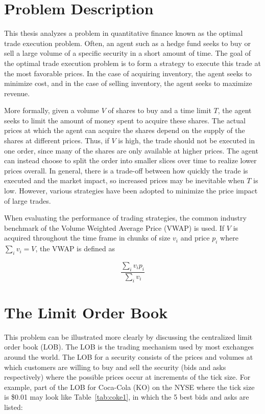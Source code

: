 \section{Problem Description} \label{ch:problemdescription}

This thesis analyzes a problem in quantitative finance known as the optimal trade execution problem. Often, an agent such as a hedge fund seeks to buy or sell a large volume of a specific security in a short amount of time. The goal of the optimal trade execution problem is to form a strategy to execute this trade at the most favorable prices. In the case of acquiring inventory, the agent seeks to minimize cost, and in the case of selling inventory, the agent seeks to maximize revenue.

More formally, given a volume $V$ of shares to buy and a time limit $T$, the agent seeks to limit the amount of money spent to acquire these shares. The actual prices at which the agent can acquire the shares depend on the supply of the shares at different prices. Thus, if $V$ is high, the trade should not be executed in one order, since many of the shares are only available at higher prices. The agent can instead choose to split the order into smaller slices over time to realize lower prices overall. In general, there is a trade-off between how quickly the trade is executed and the market impact, so increased prices may be inevitable when $T$ is low. However, various strategies have been adopted to minimize the price impact of large trades.

When evaluating the performance of trading strategies, the common industry benchmark of the Volume Weighted Average Price (VWAP) is used. If $V$ is acquired throughout the time frame in chunks of size $v_i$ and price $p_i$ where $\sum\limits_i{v_i} = V$, the VWAP is defined as 

$$ \frac{\sum\limits_i{v_i p_i}}{\sum\limits_i{v_i}}$$

\section{The Limit Order Book} \label{ch:background}
This problem can be illustrated more clearly by discussing the centralized limit order book (LOB). The LOB is the trading mechanism used by most exchanges around the world. The LOB for a security consists of the prices and volumes at which customers are willing to buy and sell the security (bids and asks respectively) where the possible prices occur at increments of the tick size. For example, part of the LOB for Coca-Cola (KO) on the NYSE where the tick size is \$0.01 may look like Table~\ref{tab:coke1}, in which the 5 best bids and asks are listed:

